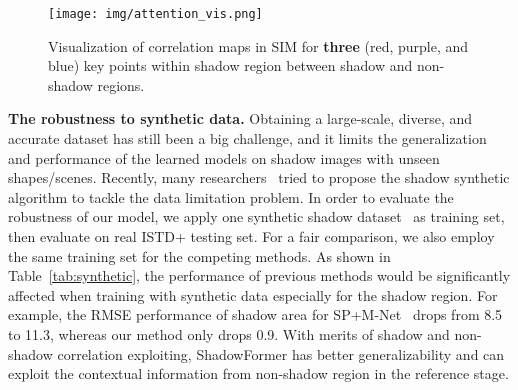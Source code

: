 \documentclass[letterpaper]{article} \usepackage{aaai23}  \usepackage{times}  \usepackage{helvet}  \usepackage{courier}  \usepackage[hyphens]{url}  \usepackage{graphicx} \urlstyle{rm} \def\UrlFont{\rm}  \usepackage{natbib}  \usepackage{caption} \frenchspacing  \setlength{\pdfpagewidth}{8.5in} \setlength{\pdfpageheight}{11in} \usepackage{algorithm}
\begin{document}
\begin{figure}[!t]
\centering
\texttt{[image: img/attention\_vis.png]}
\caption{Visualization of correlation maps in SIM for \textbf{three} (red, purple, and blue) key points within shadow region between shadow and non-shadow regions.} 
\label{fig:vis} 
\end{figure}











\noindent\textbf{The robustness to synthetic data.}
Obtaining a large-scale, diverse, and accurate dataset has still been a big challenge, and it limits the generalization and performance of the learned models on shadow images with unseen shapes/scenes.
Recently, many researchers~\cite{sidorov2019conditional,inoue2020learning} tried to propose the shadow synthetic algorithm to tackle the data limitation problem.
In order to evaluate the robustness of our model, we apply one synthetic shadow dataset~\cite{inoue2020learning} as training set, then evaluate on real ISTD+ testing set.
For a fair comparison, we also employ the same training set for the competing methods.
As shown in Table~\ref{tab:synthetic}, the performance of previous methods would be significantly affected when training with synthetic data especially for the shadow region. For example, the RMSE performance of shadow area for SP+M-Net~\cite{le2019shadow} drops from 8.5 to 11.3, whereas our method only drops 0.9.
With merits of shadow and non-shadow correlation exploiting, ShadowFormer has better generalizability and can exploit the contextual information from non-shadow region in the reference stage.

\begin{table}[!t]
\centering
\footnotesize
\setlength{\tabcolsep}{0.4em}
\renewcommand{\arraystretch}{0.7}
\caption{Quantitative evaluation results (RMSE$\downarrow$) on ISTD+ dataset over the SOTA methods and our method training with real data or synthetic data (where S, N, A represent the shadow
area, non-shadow area and all image, respectively).}
\label{tab:synthetic}
\end{table}
\end{document}
